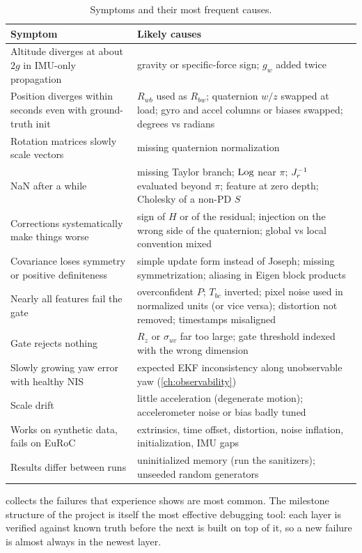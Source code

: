 \begin{table}[t]
\centering\small
\begin{tabularx}{\textwidth}{@{}>{\raggedright\arraybackslash}p{4.4cm} X@{}}
\toprule
\textbf{Symptom} & \textbf{Likely causes} \\
\midrule
Altitude diverges at about $2g$ in IMU-only propagation & gravity or specific-force sign; $g_w$ added twice \\
Position diverges within seconds even with ground-truth init & $R_{wb}$ used as $R_{bw}$; quaternion $w/z$ swapped at load; gyro and accel columns or biases swapped; degrees vs radians \\
Rotation matrices slowly scale vectors & missing quaternion normalization \\
NaN after a while & missing Taylor branch; $\operatorname{Log}$ near $\pi$; $J_r^{-1}$ evaluated beyond $\pi$; feature at zero depth; Cholesky of a non-PD $S$ \\
Corrections systematically make things worse & sign of $H$ or of the residual; injection on the wrong side of the quaternion; global vs local convention mixed \\
Covariance loses symmetry or positive definiteness & simple update form instead of Joseph; missing symmetrization; aliasing in Eigen block products \\
Nearly all features fail the gate & overconfident $P$; $T_{bc}$ inverted; pixel noise used in normalized units (or vice versa); distortion not removed; timestamps misaligned \\
Gate rejects nothing & $R_z$ or $\sigma_{uv}$ far too large; gate threshold indexed with the wrong dimension \\
Slowly growing yaw error with healthy NIS & expected EKF inconsistency along unobservable yaw (\cref{ch:observability}) \\
Scale drift & little acceleration (degenerate motion); accelerometer noise or bias badly tuned \\
Works on synthetic data, fails on EuRoC & extrinsics, time offset, distortion, noise inflation, initialization, IMU gaps \\
Results differ between runs & uninitialized memory (run the sanitizers); unseeded random generators \\
\bottomrule
\end{tabularx}
\caption{Symptoms and their most frequent causes.}
\label{tab:debugging}
\end{table}

 collects the failures that experience shows are most common. The milestone structure of the project is itself
the most effective debugging tool: each layer is verified against known truth before the next is built on top of it, so a new
failure is almost always in the newest layer.

